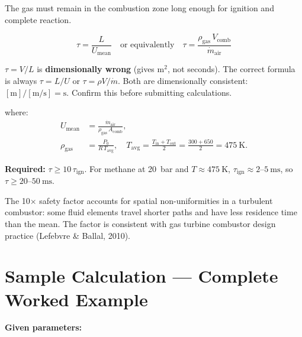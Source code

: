 \documentclass[12pt,a4paper]{report}
\begin{document}
The gas must remain in the combustion zone long enough for ignition and
complete reaction.

\begin{formulabox}
\begin{equation}
  \tau = \frac{L}{U_\text{mean}}
  \quad\text{or equivalently}\quad
  \tau = \frac{\rho_\text{gas}\,V_\text{comb}}{\dot{m}_\text{air}}
  \label{eq:tau}
\end{equation}
\end{formulabox}

\begin{warnbox}
$\tau = V/L$ is \textbf{dimensionally wrong} (gives m$^2$, not seconds).
The correct formula is always $\tau = L/U$ or $\tau = \rho V/\dot{m}$.
Both are dimensionally consistent: $[\text{m}]/[\text{m/s}] = \text{s}$.
Confirm this before submitting calculations.
\end{warnbox}

\noindent where:
\begin{align}
  U_\text{mean} &= \frac{\dot{m}_\text{air}}{\rho_\text{gas}\,A_\text{comb}},\\
  \rho_\text{gas} &= \frac{P_0}{R\,T_\text{avg}},\quad
  T_\text{avg} = \frac{T_\text{in}+T_\text{out}}{2} = \frac{300+650}{2} = 475\ \text{K}.
\end{align}

\textbf{Required:} $\tau \geq 10\,\tau_\text{ign}$.
For methane at 20~bar and $T\approx475\ \text{K}$,
$\tau_\text{ign}\approx 2$--$5\ \text{ms}$, so $\tau \geq 20$--$50\ \text{ms}$.

The 10$\times$ safety factor accounts for spatial non-uniformities in a
turbulent combustor: some fluid elements travel shorter paths and have less
residence time than the mean. The factor is consistent with gas turbine
combustor design practice (Lefebvre \& Ballal, 2010).

\chapter{Sample Calculation — Complete Worked Example}

\textbf{Given parameters:}
\end{document}
